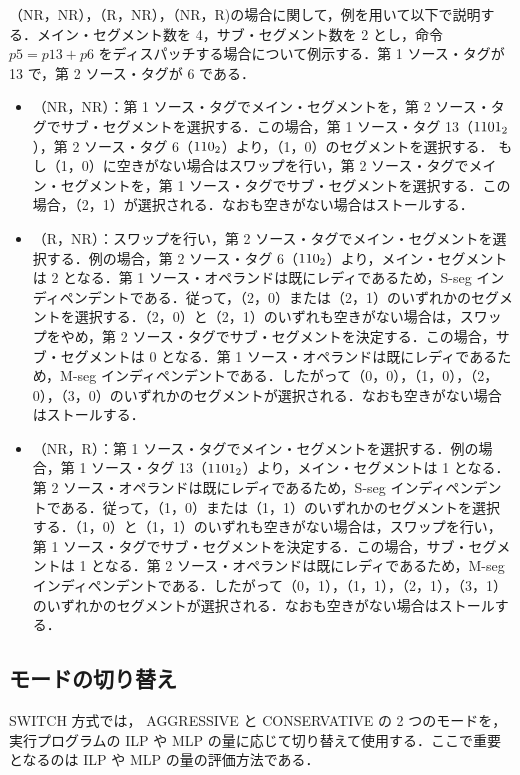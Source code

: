 （NR，NR），（R，NR），（NR，R)の場合に関して，例を用いて以下で説明する．メイン・セグメント数を 4，サブ・セグメント数を 2 とし，命令 $p5 = p13 + p6$ をディスパッチする場合について例示する．第 1 ソース・タグが 13 で，第 2 ソース・タグが 6 である．
\begin{itemize}
  \item （NR，NR）：第 1 ソース・タグでメイン・セグメントを，第 2 ソース・タグでサブ・セグメントを選択する．この場合，第 1 ソース・タグ 13（${\rm 1101_2}$），第 2 ソース・タグ 6（${\rm 110_2}$）より，（1，0）のセグメントを選択する． もし（1，0）に空きがない場合はスワップを行い，第 2 ソース・タグでメイン・セグメントを，第 1 ソース・タグでサブ・セグメントを選択する．この場合，（2，1）が選択される．なおも空きがない場合はストールする．
  \item （R，NR）：スワップを行い，第 2 ソース・タグでメイン・セグメントを選択する．例の場合，第 2 ソース・タグ 6（${\rm 110_2}$）より，メイン・セグメントは 2 となる．第 1 ソース・オペランドは既にレディであるため，S-seg インディペンデントである．従って，（2，0）または（2，1）のいずれかのセグメントを選択する．（2，0）と（2，1）のいずれも空きがない場合は，スワップをやめ，第 2 ソース・タグでサブ・セグメントを決定する．この場合，サブ・セグメントは 0 となる．第 1 ソース・オペランドは既にレディであるため，M-seg インディペンデントである．したがって（0，0），（1，0），（2，0），（3，0）のいずれかのセグメントが選択される．なおも空きがない場合はストールする．
  \item （NR，R）：第 1 ソース・タグでメイン・セグメントを選択する．例の場合，第 1 ソース・タグ 13（${\rm 1101_2}$）より，メイン・セグメントは 1 となる．第 2 ソース・オペランドは既にレディであるため，S-seg インディペンデントである．従って，（1，0）または（1，1）のいずれかのセグメントを選択する．（1，0）と（1，1）のいずれも空きがない場合は，スワップを行い，第 1 ソース・タグでサブ・セグメントを決定する．この場合，サブ・セグメントは 1 となる．第 2 ソース・オペランドは既にレディであるため，M-seg インディペンデントである．したがって（0，1），（1，1），（2，1），（3，1）のいずれかのセグメントが選択される．なおも空きがない場合はストールする．
\end{itemize}


\subsection{モードの切り替え}
SWITCH 方式では， AGGRESSIVE と CONSERVATIVE の 2 つのモードを，実行プログラムの ILP や MLP の量に応じて切り替えて使用する．ここで重要となるのは ILP や MLP の量の評価方法である．


